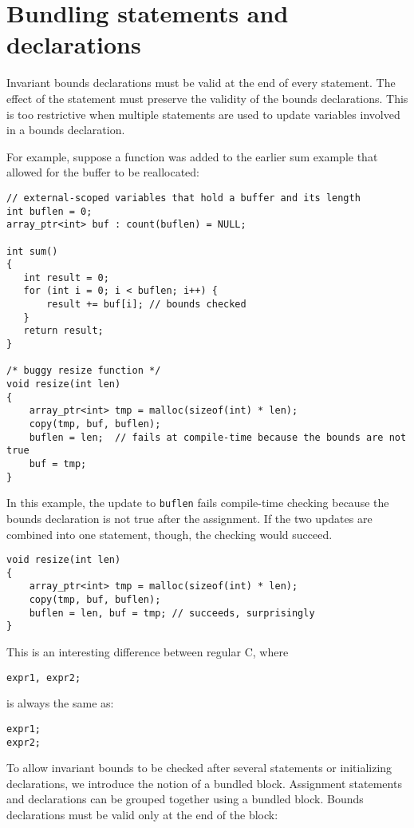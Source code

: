\section{Bundling statements and declarations}

Invariant bounds declarations must be valid at the end of every
statement. The effect of the statement must preserve the validity of the
bounds declarations. This is too restrictive when multiple statements
are used to update variables involved in a bounds declaration.

For example, suppose a function was added to the earlier sum example
that allowed for the buffer to be reallocated:
\begin{verbatim}
// external-scoped variables that hold a buffer and its length
int buflen = 0;
array_ptr<int> buf : count(buflen) = NULL;

int sum()
{
   int result = 0;
   for (int i = 0; i < buflen; i++) {
       result += buf[i]; // bounds checked
   }
   return result;
}

/* buggy resize function */
void resize(int len) 
{
    array_ptr<int> tmp = malloc(sizeof(int) * len);
    copy(tmp, buf, buflen);
    buflen = len;  // fails at compile-time because the bounds are not true
    buf = tmp;
}
\end{verbatim}
In this example, the update to \texttt{buflen} fails compile-time
checking because the bounds declaration is not true after the
assignment. If the two updates are combined into one statement, though,
the checking would succeed.

\begin{verbatim}
void resize(int len) 
{
    array_ptr<int> tmp = malloc(sizeof(int) * len);
    copy(tmp, buf, buflen);
    buflen = len, buf = tmp; // succeeds, surprisingly
}
\end{verbatim}

This is an interesting difference between regular C, where

\begin{verbatim}
expr1, expr2;
\end{verbatim}

is always the same as:

\begin{verbatim}
expr1;
expr2;
\end{verbatim}

To allow invariant bounds to be checked after several statements or
initializing declarations, we introduce the notion of a bundled block.
Assignment statements and declarations can be grouped together using a
bundled block. Bounds declarations must be valid only at the end of the
block:

